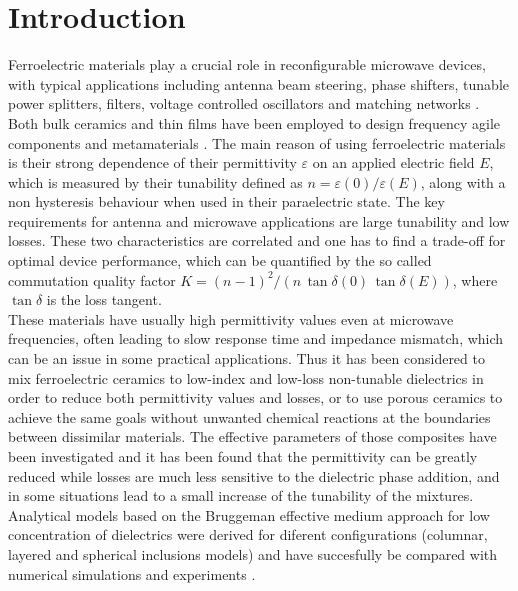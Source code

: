 \documentclass[%
 aip,
 amsmath,amssymb,
 reprint,%
]{revtex4-1}
\begin{document}
 \section{Introduction}
 Ferroelectric materials play a crucial role in reconfigurable
 microwave devices, with typical applications including antenna beam steering,
 phase shifters, tunable power splitters, filters, voltage controlled oscillators and
 matching networks \cite{tagantsev_ferroelectric_2018}. Both bulk ceramics and thin films have
 been employed to design frequency agile components \cite{vendik_ferroelectric_1999,
 lancaster_thin-film_1998,xi_oxide_2000} and metamaterials \cite{hand_frequency_2008, zhao_experimental_2008}.
 The main reason of using
 ferroelectric materials is their strong dependence of their permittivity $\varepsilon$
 on an applied electric field $E$, which is measured by their tunability defined as $n = \varepsilon(0)/\varepsilon(E)$,
 along with a non hysteresis behaviour when used in their paraelectric state.
 The key requirements for antenna and microwave applications are large tunability and low losses.
 These two characteristics are correlated and one has to find a trade-off for optimal
  device performance, which can be quantified by the so called commutation quality factor
 $K = (n -1)^2/(n\, \tan\delta(0)\,\tan\delta(E))$, where $\tan\delta$ is the loss tangent.\\
 These materials have usually high permittivity values even at microwave frequencies,
 often leading to slow response time and impedance mismatch, which can be an issue in some practical
 applications. Thus it has been considered to mix ferroelectric ceramics to low-index and
 low-loss non-tunable dielectrics in order to reduce both permittivity values and losses, or to
 use porous ceramics to achieve the same goals without unwanted chemical reactions at the boundaries between dissimilar materials.
The effective parameters of those composites have been investigated
\cite{sherman_ferroelectric-dielectric_2006, jylha_tunability_2008, sherman_tunability_2004, astafiev_can_2003}
and it has been found that the permittivity can be greatly reduced while losses are much less
 sensitive to the dielectric phase addition, and in some situations lead to a small
  increase of the tunability of the mixtures. Analytical models based on the Bruggeman effective
medium approach for low concentration of dielectrics were derived for diferent configurations (columnar, layered and spherical
inclusions models) and have succesfully be compared with numerical simulations and experiments \cite{sherman_ferroelectric-dielectric_2006}.
\end{document}
